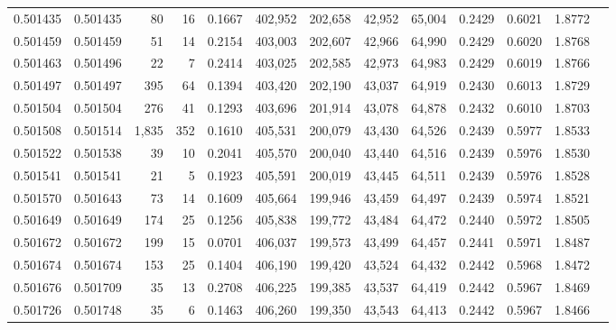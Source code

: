 \begin{tabular}{rrrrrrrrrrrrr}
0.501435 & 0.501435 &    80 &    16 &                                     0.1667 & 402,952 & 202,658 &  42,952 &  65,004 & 0.2429 & 0.6021 & 1.8772 \\
0.501459 & 0.501459 &    51 &    14 &                                     0.2154 & 403,003 & 202,607 &  42,966 &  64,990 & 0.2429 & 0.6020 & 1.8768 \\
0.501463 & 0.501496 &    22 &     7 &                                     0.2414 & 403,025 & 202,585 &  42,973 &  64,983 & 0.2429 & 0.6019 & 1.8766 \\
0.501497 & 0.501497 &   395 &    64 &                                     0.1394 & 403,420 & 202,190 &  43,037 &  64,919 & 0.2430 & 0.6013 & 1.8729 \\
0.501504 & 0.501504 &   276 &    41 &                                     0.1293 & 403,696 & 201,914 &  43,078 &  64,878 & 0.2432 & 0.6010 & 1.8703 \\
0.501508 & 0.501514 & 1,835 &   352 &                                     0.1610 & 405,531 & 200,079 &  43,430 &  64,526 & 0.2439 & 0.5977 & 1.8533 \\
0.501522 & 0.501538 &    39 &    10 &                                     0.2041 & 405,570 & 200,040 &  43,440 &  64,516 & 0.2439 & 0.5976 & 1.8530 \\
0.501541 & 0.501541 &    21 &     5 &                                     0.1923 & 405,591 & 200,019 &  43,445 &  64,511 & 0.2439 & 0.5976 & 1.8528 \\
0.501570 & 0.501643 &    73 &    14 &                                     0.1609 & 405,664 & 199,946 &  43,459 &  64,497 & 0.2439 & 0.5974 & 1.8521 \\
0.501649 & 0.501649 &   174 &    25 &                                     0.1256 & 405,838 & 199,772 &  43,484 &  64,472 & 0.2440 & 0.5972 & 1.8505 \\
0.501672 & 0.501672 &   199 &    15 &                                     0.0701 & 406,037 & 199,573 &  43,499 &  64,457 & 0.2441 & 0.5971 & 1.8487 \\
0.501674 & 0.501674 &   153 &    25 &                                     0.1404 & 406,190 & 199,420 &  43,524 &  64,432 & 0.2442 & 0.5968 & 1.8472 \\
0.501676 & 0.501709 &    35 &    13 &                                     0.2708 & 406,225 & 199,385 &  43,537 &  64,419 & 0.2442 & 0.5967 & 1.8469 \\
0.501726 & 0.501748 &    35 &     6 &                                     0.1463 & 406,260 & 199,350 &  43,543 &  64,413 & 0.2442 & 0.5967 & 1.8466 \\

\end{tabular}
